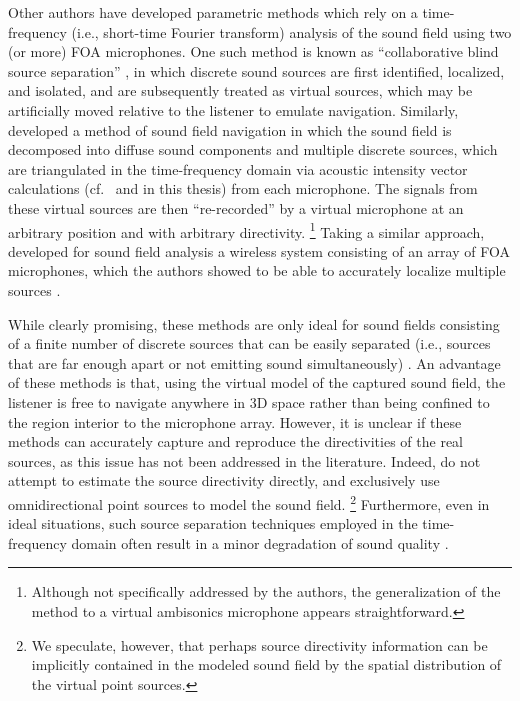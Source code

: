 Other authors have developed parametric methods which rely on a time-frequency (i.e., short-time Fourier transform) analysis of the sound field using two (or more) FOA microphones.
One such method is known as ``collaborative blind source separation'' \citep[section 3.3]{Zheng2013PhD}, in which discrete sound sources are first identified, localized, and isolated, and are subsequently treated as virtual sources, which may be artificially moved relative to the listener to emulate navigation.
Similarly, \citet{Thiergart2013} developed a method of sound field navigation in which the sound field is decomposed into diffuse sound components and multiple discrete sources, which are triangulated in the time-frequency domain via acoustic intensity vector calculations (cf.~\citet[Eq.~(11)]{MerimaaPulkki2005} and  in this thesis) from each microphone.
The signals from these virtual sources are then ``re-recorded'' by a virtual microphone at an arbitrary position and with arbitrary directivity.%
\footnote{Although not specifically addressed by the authors, the generalization of the method to a virtual ambisonics microphone appears straightforward.}
Taking a similar approach, \citet{Schorkhuber2014a} developed for sound field analysis a wireless system consisting of an array of FOA microphones, which the authors showed to be able to accurately localize multiple sources \citep{Schorkhuber2014a,Schorkhuber2014b}.

While clearly promising, these methods are only ideal for sound fields consisting of a finite number of discrete sources that can be easily separated (i.e., sources that are far enough apart or not emitting sound simultaneously) \citep[section II]{Thiergart2013}.
An advantage of these methods is that, using the virtual model of the captured sound field, the listener is free to navigate anywhere in 3D space rather than being confined to the region interior to the microphone array.
However, it is unclear if these methods can accurately capture and reproduce the directivities of the real sources, as this issue has not been addressed in the literature.
Indeed, \citet{Thiergart2013} do not attempt to estimate the source directivity directly, and exclusively use omnidirectional point sources to model the sound field.%
\footnote{We speculate, however, that perhaps source directivity information can be implicitly contained in the modeled sound field by the spatial distribution of the virtual point sources.}
Furthermore, even in ideal situations, such source separation techniques employed in the time-frequency domain often result in a minor degradation of sound quality \citep[section 5.3]{Zheng2013PhD}.

